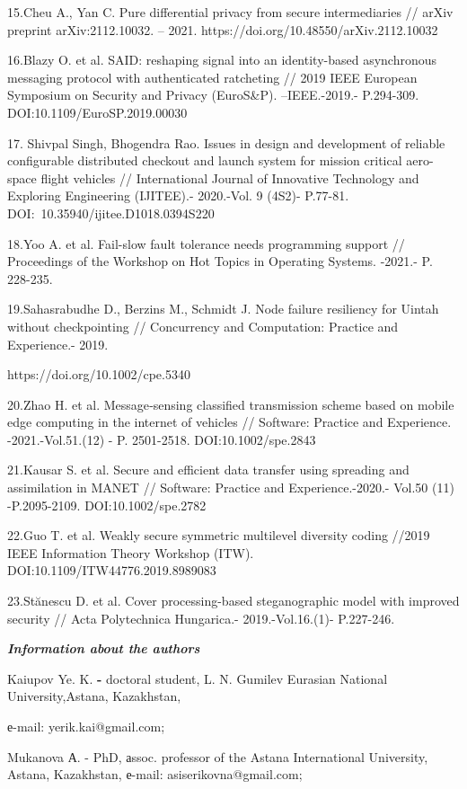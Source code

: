 15.Cheu A., Yan C. Pure differential privacy from secure intermediaries
// arXiv preprint arXiv:2112.10032. -- 2021.
https://doi.org/10.48550/arXiv.2112.10032

16.Blazy O. et al. SAID: reshaping signal into an identity-based
asynchronous messaging protocol with authenticated ratcheting // 2019
IEEE European Symposium on Security and Privacy (EuroS\&P).
--IEEE.-2019.- P.294-309. DOI:10.1109/EuroSP.2019.00030

17. Shivpal Singh, Bhogendra Rao. Issues in design and development of
reliable configurable distributed checkout and launch system for mission
critical aero-space flight vehicles // International Journal of
Innovative Technology and Exploring Engineering (IJITEE).- 2020.-Vol. 9
(4S2)- P.77-81. DOI:~10.35940/ijitee.D1018.0394S220

18.Yoo A. et al. Fail-slow fault tolerance needs programming support //
Proceedings of the Workshop on Hot Topics in Operating Systems. -2021.-
P. 228-235.

19.Sahasrabudhe D., Berzins M., Schmidt J. Node failure resiliency for
Uintah without checkpointing // Concurrency and Computation: Practice
and Experience.- 2019.

https://doi.org/10.1002/cpe.5340

20.Zhao H. et al. Message‐sensing classified transmission scheme based
on mobile edge computing in the internet of vehicles // Software:
Practice and Experience. -2021.-Vol.51.(12) - P. 2501-2518.
DOI:10.1002/spe.2843

21.Kausar S. et al. Secure and efficient data transfer using spreading
and assimilation in MANET // Software: Practice and Experience.-2020.-
Vol.50 (11) -P.2095-2109. DOI:10.1002/spe.2782

22.Guo T. et al. Weakly secure symmetric multilevel diversity coding
//2019 IEEE Information Theory Workshop (ITW).
DOI:10.1109/ITW44776.2019.8989083

23.Stănescu D. et al. Cover processing-based steganographic model with
improved security // Acta Polytechnica Hungarica.- 2019.-Vol.16.(1)-
P.227-246.

\emph{\textbf{Information about the authors}}

Kaiupov Ye. K. \textbf{-} doctoral student, L. N. Gumilev Eurasian
National University,Astana, Kazakhstan,

е-mail: yerik.kai@gmail.com;

Mukanova А. - PhD, аssoc. professor of the Astana International
University, Astana, Kazakhstan, е-mail: asiserikovna@gmail.com;

